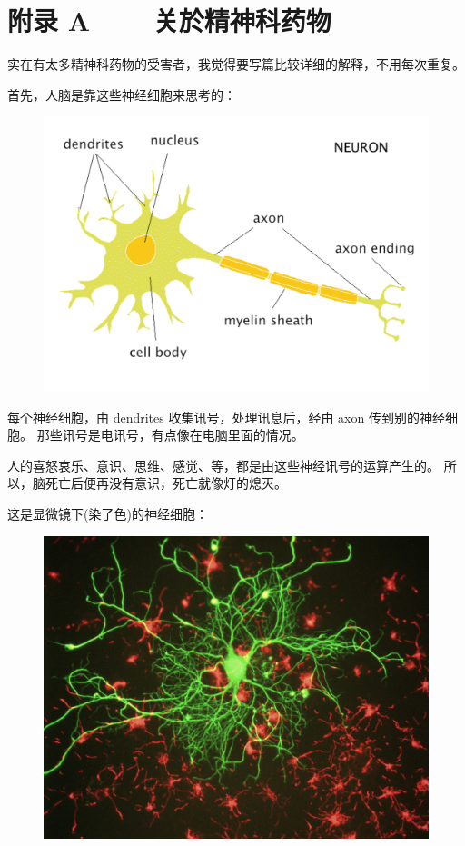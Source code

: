 \documentclass[12pt]{report}
\begin{document}
{\chapter*{附录 A ~~~ 关於精神科药物}

实在有太多精神科药物的受害者，我觉得要写篇比较详细的解释，不用每次重复。

首先，人脑是靠这些神经细胞来思考的：
\begin{figure}[H]
\centering
\includegraphics[scale=0.4]{neuron.pdf}
\end{figure}

每个神经细胞，由 dendrites 收集讯号，处理讯息后，经由 axon 传到别的神经细胞。 那些讯号是电讯号，有点像在电脑里面的情况。

人的喜怒哀乐、意识、思维、感觉、等，都是由这些神经讯号的运算产生的。 所以，脑死亡后便再没有意识，死亡就像灯的熄灭。

这是显微镜下(染了色)的神经细胞：
\begin{figure}[H]
\centering
\includegraphics[scale=0.25]{neuron_in_tissue_culture.jpg}
\end{figure}

}
\end{document}
